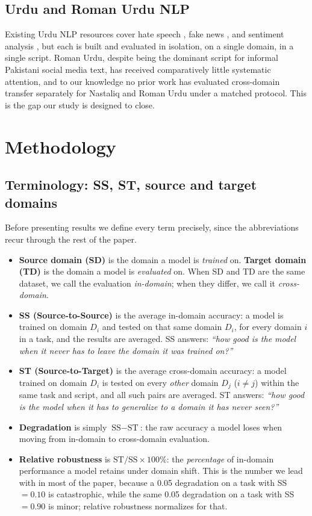 \documentclass[10pt,twocolumn,journal]{IEEEtran}
\begin{document}
\subsection{Urdu and Roman Urdu NLP}
Existing Urdu NLP resources cover hate speech \cite{malik2020urdu}, fake news \cite{Karim2020}, and sentiment analysis \cite{hasan2018urdusentilex}, but each is built and evaluated in isolation, on a single domain, in a single script. Roman Urdu, despite being the dominant script for informal Pakistani social media text, has received comparatively little systematic attention, and to our knowledge no prior work has evaluated cross-domain transfer separately for Nastaliq and Roman Urdu under a matched protocol. This is the gap our study is designed to close.

\section{Methodology}

\subsection{Terminology: SS, ST, source and target domains}
\label{sec:terminology}

Before presenting results we define every term precisely, since the abbreviations recur through the rest of the paper.

\begin{itemize}[leftmargin=*]
\item \textbf{Source domain (SD)} is the domain a model is \emph{trained} on. \textbf{Target domain (TD)} is the domain a model is \emph{evaluated} on. When SD and TD are the same dataset, we call the evaluation \emph{in-domain}; when they differ, we call it \emph{cross-domain}.
\item \textbf{SS (Source-to-Source)} is the average in-domain accuracy: a model is trained on domain $D_i$ and tested on that same domain $D_i$, for every domain $i$ in a task, and the results are averaged. SS answers: \emph{``how good is the model when it never has to leave the domain it was trained on?''}
\item \textbf{ST (Source-to-Target)} is the average cross-domain accuracy: a model trained on domain $D_i$ is tested on every \emph{other} domain $D_j$ ($i \neq j$) within the same task and script, and all such pairs are averaged. ST answers: \emph{``how good is the model when it has to generalize to a domain it has never seen?''}
\item \textbf{Degradation} is simply $\text{SS} - \text{ST}$: the raw accuracy a model loses when moving from in-domain to cross-domain evaluation.
\item \textbf{Relative robustness} is $\text{ST}/\text{SS} \times 100\%$: the \emph{percentage} of in-domain performance a model retains under domain shift. This is the number we lead with in most of the paper, because a 0.05 degradation on a task with SS $=0.10$ is catastrophic, while the same 0.05 degradation on a task with SS $=0.90$ is minor; relative robustness normalizes for that.
\end{itemize}
\end{document}
